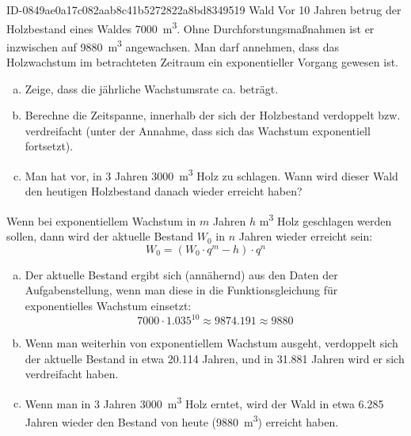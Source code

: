 \begin{exercise}
      {ID-0849ae0a17c082aab8c41b5272822a8bd8349519}
      {Wald}
  \ifproblem\problem
    Vor 10 Jahren betrug der Holzbestand eines Waldes \SI{7000}{\cubic\metre}.
    Ohne Durchforstungsmaßnahmen ist er inzwischen auf \SI{9880}{\cubic\metre}
    angewachsen. Man darf annehmen, dass das Holzwachstum im
    betrachteten Zeitraum ein exponentieller Vorgang gewesen ist.
    \begin{enumerate}[a)]
      \item Zeige, dass die jährliche Wachstumsrate ca.  beträgt.
      \item Berechne die Zeitspanne, innerhalb der sich der Holzbestand
            verdoppelt bzw. verdreifacht (unter der Annahme, dass sich
            das Wachstum exponentiell fortsetzt).
      \item Man hat vor, in 3 Jahren \SI{3000}{\cubic\metre} Holz zu schlagen.
            Wann wird dieser Wald den heutigen Holzbestand danach
            wieder erreicht haben?
    \end{enumerate}
  \fi
  \ifoutline\outline
    Wenn bei exponentiellem Wachstum in $m$ Jahren $h$
    \si{\cubic\metre} Holz geschlagen werden sollen, dann
    wird der aktuelle Bestand $W_{0}$ in $n$ Jahren wieder
    erreicht sein:
    \begin{equation*}
      W_{0}=\left(W_{0}\cdot q^{m}-h\right)\cdot q^{n}
    \end{equation*}
  \fi
  \ifoutcome\outcome
    \begin{enumerate}[a)]
      \item Der aktuelle Bestand ergibt sich (annähernd) aus
            den Daten der Aufgabenstellung, wenn man diese in
            die Funktionsgleichung für exponentielles Wachstum
            einsetzt:
            \begin{equation*}
              \num{7000}\cdot\num{1.035}^{10}\approx\num{9874.191}\approx\num{9880}
            \end{equation*}
      \item Wenn man weiterhin von exponentiellem Wachstum ausgeht,
            verdoppelt sich der aktuelle Bestand in etwa \num{20.114}
            Jahren, und in \num{31.881} Jahren wird er sich verdreifacht
            haben.
      \item Wenn man in 3 Jahren \SI{3000}{\cubic\metre} Holz erntet,
            wird der Wald in etwa \num{6.285} Jahren wieder den
            Bestand von heute (\SI{9880}{\cubic\metre}) erreicht haben.
    \end{enumerate}
  \fi
\end{exercise}
